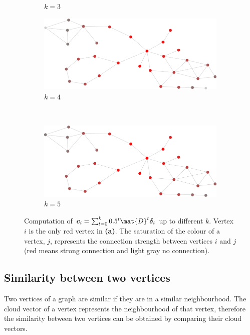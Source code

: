 \documentclass[12pt]{report}
\begin{document}
\begin{figure}[tpb]
\begin{subfigure}[b]{0.5\textwidth}
    \caption{$k=3$}
  \end{subfigure}
  \begin{subfigure}[b]{0.5\textwidth}
    \includegraphics[width=\textwidth]{frame4}
		\caption{$k=4$}
  \end{subfigure}%
  ~
  \begin{subfigure}[b]{0.5\textwidth}
    \includegraphics[width=\textwidth]{frame5}
    \caption{$k=5$}
  \end{subfigure}


  \caption{Computation of $\bm{c}_i = \sum_{t=0}^k 0.5^t \mat{D}^t \bm{\delta}_i$ up
  to different $k$. Vertex $i$ is the only red vertex in \textbf{(a)}. The
  saturation of the colour of a vertex, $j$, represents the connection strength
  between vertices $i$ and $j$ (red means strong connection and light gray no
  connection).}
  \label{fig:ci_diffusion}
\end{figure}

\subsection{Similarity between two vertices}

Two vertices of a graph are similar if they are in a similar neighbourhood. The
cloud vector of a vertex represents the neighbourhood of that vertex, therefore
the similarity between two vertices can be obtained by comparing their cloud
vectors.
\end{document}
